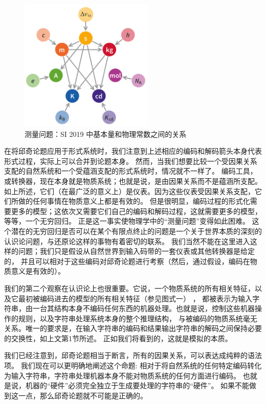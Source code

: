 \documentclass[a4paper,12pt]{article}
\begin{document}
\begin{figure}[ht]
\centering
\includegraphics[height=2.5in]{images/unit_relations_SI.png}
\caption{测量问题：SI 2019 中基本量和物理常数之间的关系}
\end{figure}

在将邱奇论题应用于形式系统时，我们注意到上述相应的编码和解码箭头本身代表形式过程，实际上可以合并到论题本身。
然而，当我们想要比较一个受因果关系支配的自然系统和一个受蕴涵支配的形式系统时，情况就不一样了。
编码工具，或转换器，现在本身就是物质系统；也就是说，是由因果关系而不是蕴涵所支配。
如上所述，它们（在最广泛的意义上）是仪表。因为这些仪表受因果关系支配，它们所做的任何事情在物质意义上都是有效的。
但是很明显，编码过程的形式化需要更多的模型；这依次又需要它们自己的编码和解码过程，这就需要更多的模型，等等，一个无穷回归。
正是这一事实使物理学中的“测量问题”变得如此困难。
这个潜在的无穷回归是否可以在某个有限点终止的问题是一个关于世界本质的深刻的认识论问题，与还原论这样的事物有着密切的联系。
我们当然不能在这里进入这样的问题；我们只是假设从自然世界到输入码带的一套仪表或其他转换器是给定的，
并且可以相对于这些编码对邱奇论题进行考察（然后，通过假设，编码在物质意义是有效的）。

我们的第二个观察在认识论上也很重要。它说，一个物质系统的所有相关特征，以及它最初被编码进去的模型的所有相关特征（参见图式一） ，
都被表示为输入字符串，由一台其结构本身不编码任何东西的机器处理。也就是说，控制这些机器操作的规则，以及字符串处理系统本身的整个推理结构，
与被编码的物质系统毫无关系。唯一的要求是，在输入字符串的编码和结果输出字符串的解码之间保持必要的交换性，如上文第1节所述。
正如我们将看到的，这就是模拟的本质。

我们已经注意到，邱奇论题相当于断言，所有的因果关系，可以表达成纯粹的语法项。
我们现在可以更明确地阐述这个命题: 相对于将自然系统的任何特定编码转化为输入字符串，字符串处理机器本身不能对物质系统的任何方面进行编码。
也就是说，机器的“硬件”必须完全独立于生成要处理的字符串的“硬件”。 如果不能做到这一点，那么邱奇论题就不可能是正确的。
\end{document}
